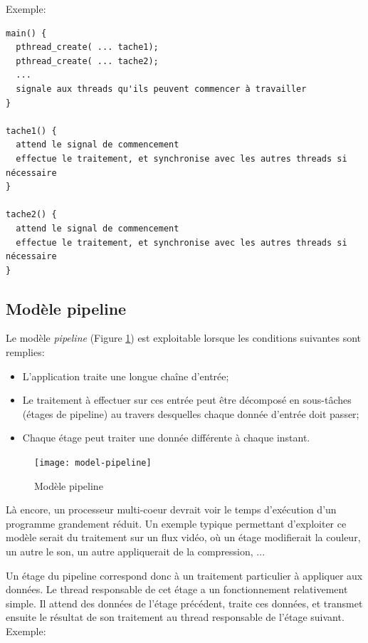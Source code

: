 Exemple:

\begin{lstlisting}[frame=trBL]
main() {
  pthread_create( ... tache1);
  pthread_create( ... tache2);
  ...
  signale aux threads qu'ils peuvent commencer à travailler
}

tache1() {
  attend le signal de commencement
  effectue le traitement, et synchronise avec les autres threads si nécessaire
}

tache2() {
  attend le signal de commencement
  effectue le traitement, et synchronise avec les autres threads si nécessaire
}
\end{lstlisting}

\subsection{Modèle pipeline}

Le modèle \emph{pipeline} (Figure \ref{fig:model-pipeline}) est exploitable lorsque les conditions suivantes sont remplies:

\begin{itemize}
\item L'application traite une longue chaîne d'entrée;
\item Le traitement à effectuer sur ces entrée peut être décomposé en sous-tâches (étages de pipeline) au travers desquelles chaque donnée d'entrée doit passer;
\item Chaque étage peut traiter une donnée différente à chaque instant.
\end{itemize}


\begin{figure}[ht]
  \begin{center}
    \texttt{[image: model-pipeline]}
    \caption{\label{fig:model-pipeline}Modèle pipeline}
  \end{center}
\end{figure}


Là encore, un processeur multi-coeur devrait voir le temps d'exécution d'un programme grandement réduit. Un exemple typique permettant d'exploiter ce modèle serait du traitement sur un flux vidéo, où un étage modifierait la couleur, un autre le son, un autre appliquerait de la compression, ...

Un étage du pipeline correspond donc à un traitement particulier à appliquer aux données. Le thread responsable de cet étage a un fonctionnement relativement simple. Il attend des données de l'étage précédent, traite ces données, et transmet ensuite le résultat de son traitement au thread responsable de l'étage suivant.
\newpage
Exemple:


